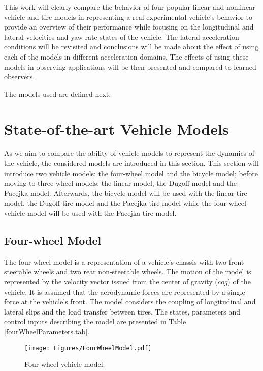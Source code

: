 \documentclass[journal]{IEEEtran}
\begin{document}
This work will clearly compare the behavior of four popular linear and nonlinear vehicle and tire models in representing a real experimental vehicle's behavior to provide an overview of their performance while focusing on the longitudinal and lateral velocities and yaw rate states of the vehicle. The lateral acceleration conditions will be revisited and conclusions will be made about the effect of using each of the models in different acceleration domains. The effects of using these models in observing applications will be then presented and compared to learned observers.


The models used are defined next. 


\section{State-of-the-art Vehicle Models}\label{soa.sec}
As we aim to compare the ability of vehicle models to represent the dynamics of the vehicle, the considered models are introduced in this section. This section will introduce two vehicle models: the four-wheel model and the bicycle model; before moving to three wheel models: the linear model, the Dugoff model and the Pacejka \cite{pacejka_magic_1997} model. Afterwards, the bicycle model will be used with the linear tire model, the Dugoff tire model and the Pacejka tire model while the four-wheel vehicle model will be used with the Pacejka tire model. 

\subsection{Four-wheel Model}
The four-wheel model is a representation of a vehicle's chassis with two front steerable wheels and two rear non-steerable wheels. The motion of the model is represented by the velocity vector issued from the center of gravity ($cog$) of the vehicle. 
It is assumed that the aerodynamic forces are represented by a single force at the vehicle's front. The model considers the coupling of longitudinal and lateral slips and the load transfer between tires. The states, parameters and control inputs describing the model are presented in Table \ref{fourWheelParameters.tab}.


\begin{figure}[h]
    \centering
    \texttt{[image: Figures/FourWheelModel.pdf]}
    \caption{Four-wheel vehicle model.}
    \label{fig:enter-label}
\end{figure}
\end{document}
